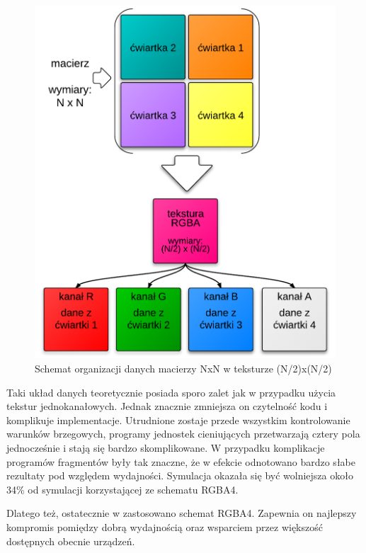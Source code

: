 \begin{figure}[!h]
\centering
\includegraphics[width=.9\textwidth]{img/rgba14Tex}
\caption{Schemat organizacji danych macierzy NxN w teksturze (N/2)x(N/2)}
\label{fig:rgba14Tex}
\end{figure}

Taki układ danych teoretycznie posiada sporo zalet jak w przypadku użycia
tekstur jednokanałowych. Jednak znacznie zmniejsza on czytelność kodu i
komplikuje implementacje. Utrudnione zostaje przede wszystkim kontrolowanie
warunków brzegowych, programy jednostek cieniujących przetwarzają cztery pola
jednocześnie i stają się bardzo skomplikowane. W przypadku 
komplikacje programów fragmentów były tak znaczne, że w efekcie odnotowano
bardzo słabe rezultaty pod względem wydajności. Symulacja okazała się być
wolniejsza około 34\% od symulacji korzystającej ze schematu RGBA4.

Dlatego też, ostatecznie w  zastosowano schemat RGBA4. Zapewnia on
najlepszy kompromis pomiędzy dobrą wydajnością oraz wsparciem przez większość
dostępnych obecnie urządzeń.

